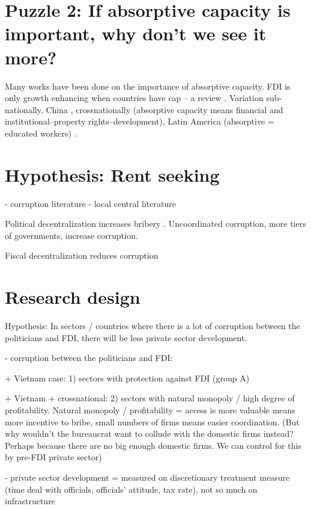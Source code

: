 \documentclass[12pt]{article}
\begin{document}
\section{Puzzle 2: If absorptive capacity is important, why don't we see it more?}

Many works have been done on the importance of absorptive capacity. FDI is only growth enhancing when countries have cap -- a review \citep{Gorg2004}. Variation sub-nationally, China \citep{Fu2008}, crossnationally (absorptive capacity means financial and institutional--property rights--development)\citep{Durham2004}, Latin America (absorptive = educated workers) \citep{Willem2004}.

\section{Hypothesis: Rent seeking}

- corruption literature
- local central literature

Political decentralization increases bribery \citep{Fan2009}. Uncoordinated corruption, more tiers of governments, increase corruption.

Fiscal decentralization reduces corruption \citep{Guerra2009}

\section{Research design}

Hypothesis: In sectors / countries where there is a lot of corruption between the politicians and FDI, there will be less private sector development.

- corruption between the politicians and FDI: 

+ Vietnam case: 1) sectors with protection against FDI (group A) 

+ Vietnam + crossnational: 2) sectors with natural monopoly / high degree of profitability. Natural monopoly / profitability = access is more valuable means more incentive to bribe, small numbers of firms means easier coordination. (But why wouldn't the bureaucrat want to collude with the domestic firms instead? Perhaps because there are no big enough domestic firms. We can control for this by pre-FDI private sector)


- private sector development = measured on discretionary treatment measure (time deal with officials, officials' attitude, tax rate), not so much on infrastructure
\end{document}
